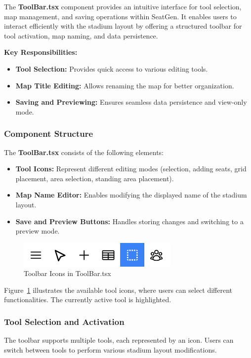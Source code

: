 The \textbf{ToolBar.tsx} component provides an intuitive interface for tool selection, map management, and saving operations within SeatGen. It enables users to interact efficiently with the stadium layout by offering a structured toolbar for tool activation, map naming, and data persistence.

\textbf{Key Responsibilities:}
\begin{itemize}
    \item \textbf{Tool Selection:} Provides quick access to various editing tools.
    \item \textbf{Map Title Editing:} Allows renaming the map for better organization.
    \item \textbf{Saving and Previewing:} Ensures seamless data persistence and view-only mode.
\end{itemize}

\subsubsection{Component Structure}
The \textbf{ToolBar.tsx} consists of the following elements:
\begin{itemize}
    \item \textbf{Tool Icons:} Represent different editing modes (selection, adding seats, grid placement, area selection, standing area placement).
    \item \textbf{Map Name Editor:} Enables modifying the displayed name of the stadium layout.
    \item \textbf{Save and Preview Buttons:} Handles storing changes and switching to a preview mode.
\end{itemize}

\begin{figure}[H]
    \centering
    \includegraphics[width=0.7\textwidth]{pics/toolbar01.png}
    \caption{Toolbar Icons in ToolBar.tsx}
    \label{fig:toolbar-icons}
\end{figure}

Figure~\ref{fig:toolbar-icons} illustrates the available tool icons, where users can select different functionalities. The currently active tool is highlighted.

\subsubsection{Tool Selection and Activation}
The toolbar supports multiple tools, each represented by an icon. Users can switch between tools to perform various stadium layout modifications.


